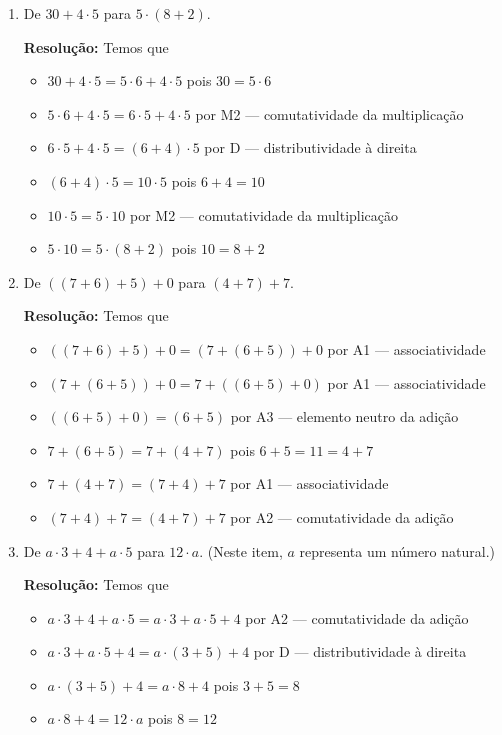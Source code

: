 \documentclass[12pt,a4paper]{article}
\begin{document}
\begin{enumerate}[label=(\alph*)]
\begin{enumerate}[label=(\alph*)]
        \item De $30 + 4 \cdot 5$ para $5 \cdot (8 + 2)$.
        
        \textbf{Resolução:} Temos que
        \begin{itemize}
            \item $30 + 4 \cdot 5 = 5 \cdot 6 + 4 \cdot 5$ \hfill pois $30 = 5 \cdot 6$
            \item $5 \cdot 6 + 4 \cdot 5 = 6 \cdot 5 + 4 \cdot 5$ \hfill por M2 — comutatividade da multiplicação
            \item $6 \cdot 5 + 4 \cdot 5 = (6 + 4) \cdot 5$ \hfill por D — distributividade à direita
            \item $(6 + 4) \cdot 5 = 10 \cdot 5$ \hfill pois $6 + 4 = 10$
            \item $10 \cdot 5 = 5 \cdot 10$ \hfill por M2 — comutatividade da multiplicação
            \item $5 \cdot 10 = 5 \cdot (8 + 2)$ \hfill pois $10 = 8 + 2$
        \end{itemize}
        
        \item De $((7 + 6) + 5) + 0$ para $(4 + 7) + 7$.
        
        \textbf{Resolução:} Temos que
        \begin{itemize}
            \item $((7 + 6) + 5) + 0 = (7 + (6 + 5)) + 0$ \hfill por A1 — associatividade
            \item $(7 + (6 + 5)) + 0 = 7 + ((6 + 5) + 0)$ \hfill por A1 — associatividade
            \item $((6 + 5) + 0) = (6 + 5)$ \hfill por A3 — elemento neutro da adição
            \item $7 + (6 + 5) = 7 + (4 + 7)$ \hfill pois $6 + 5 = 11 = 4 + 7$
            \item $7 + (4 + 7) = (7 + 4) + 7$ \hfill por A1 — associatividade
            \item $(7 + 4) + 7 = (4 + 7) + 7$ \hfill por A2 — comutatividade da adição
        \end{itemize}
        
        \item De $a \cdot 3 + 4 + a \cdot 5$ para $12 \cdot a$. (Neste item, $a$ representa um número natural.)
        
        \textbf{Resolução:} Temos que
        \begin{itemize}
            \item $a \cdot 3 + 4 + a \cdot 5 = a \cdot 3 + a \cdot 5 + 4$ \hfill por A2 — comutatividade da adição
            \item $a \cdot 3 + a \cdot 5 + 4 = a \cdot (3 + 5) + 4$ \hfill por D — distributividade à direita
            \item $a \cdot (3 + 5) + 4 = a \cdot 8 + 4$ \hfill pois $3 + 5 = 8$
            \item $a \cdot 8 + 4 = 12 \cdot a$ \hfill pois $8 = 12$
        \end{itemize}
    \end{enumerate}
    

\end{enumerate}
\end{document}
